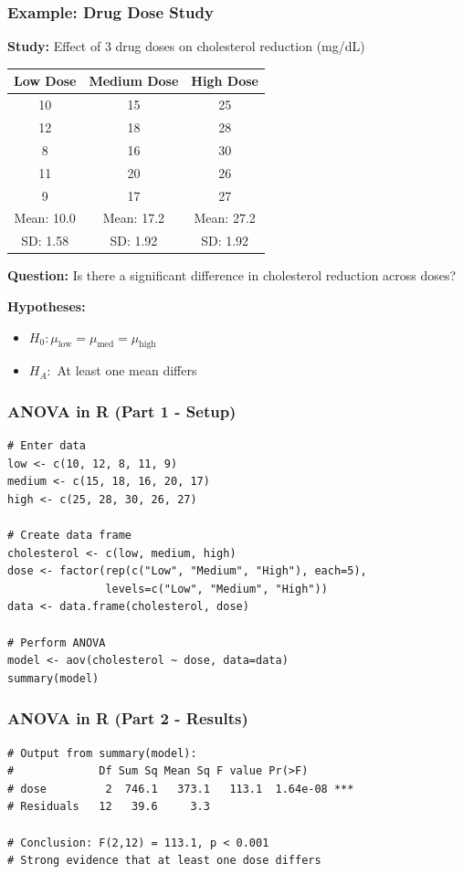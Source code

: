 \documentclass{beamer}
\begin{document}
\begin{frame}
\frametitle{Example: Drug Dose Study}
\textbf{Study:} Effect of 3 drug doses on cholesterol reduction (mg/dL)

\vspace{0.1cm}
\begin{center}
\begin{tabular}{ccc}
\toprule
Low Dose & Medium Dose & High Dose \\
\midrule
10 & 15 & 25 \\
12 & 18 & 28 \\
8 & 16 & 30 \\
11 & 20 & 26 \\
9 & 17 & 27 \\
\midrule
Mean: 10.0 & Mean: 17.2 & Mean: 27.2 \\
SD: 1.58 & SD: 1.92 & SD: 1.92 \\
\bottomrule
\end{tabular}
\end{center}

\vspace{0.1cm}
\textbf{Question:} Is there a significant difference in cholesterol reduction across doses?

\vspace{0.1cm}
\textbf{Hypotheses:}
\begin{itemize}
\setlength\itemsep{-0.2em}
\item $H_0: \mu_{\text{low}} = \mu_{\text{med}} = \mu_{\text{high}}$
\item $H_A:$ At least one mean differs
\end{itemize}
\end{frame}

\begin{frame}[fragile]
\frametitle{ANOVA in R (Part 1 - Setup)}
\footnotesize
\begin{verbatim}
# Enter data
low <- c(10, 12, 8, 11, 9)
medium <- c(15, 18, 16, 20, 17)
high <- c(25, 28, 30, 26, 27)

# Create data frame
cholesterol <- c(low, medium, high)
dose <- factor(rep(c("Low", "Medium", "High"), each=5),
               levels=c("Low", "Medium", "High"))
data <- data.frame(cholesterol, dose)

# Perform ANOVA
model <- aov(cholesterol ~ dose, data=data)
summary(model)
\end{verbatim}
\end{frame}

\begin{frame}[fragile]
\frametitle{ANOVA in R (Part 2 - Results)}
\footnotesize
\begin{verbatim}
# Output from summary(model):
#             Df Sum Sq Mean Sq F value Pr(>F)
# dose         2  746.1   373.1   113.1  1.64e-08 ***
# Residuals   12   39.6     3.3

# Conclusion: F(2,12) = 113.1, p < 0.001
# Strong evidence that at least one dose differs
\end{verbatim}
\end{frame}
\end{document}
